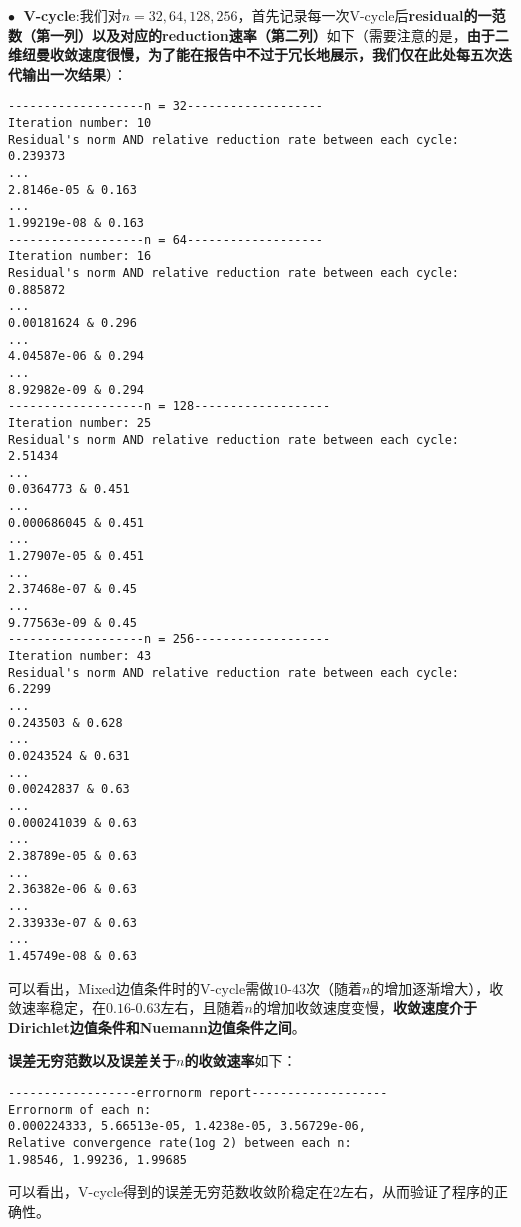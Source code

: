 \documentclass{ctexart}
\begin{document}
\begin{sloppypar}
$\bullet \;$ \textbf{V-cycle}:我们对$n=32,64,128,256$，首先记录每一次V-cycle后\textbf{residual的一范数（第一列）以及对应的reduction速率（第二列）}如下（需要注意的是，\textbf{由于二维纽曼收敛速度很慢，为了能在报告中不过于冗长地展示，我们仅在此处每五次迭代输出一次结果}）：
\begin{shaded}
\begin{verbatim}
-------------------n = 32-------------------
Iteration number: 10
Residual's norm AND relative reduction rate between each cycle: 
0.239373
...
2.8146e-05 & 0.163
...
1.99219e-08 & 0.163
-------------------n = 64-------------------
Iteration number: 16
Residual's norm AND relative reduction rate between each cycle: 
0.885872
...
0.00181624 & 0.296
...
4.04587e-06 & 0.294
...
8.92982e-09 & 0.294
-------------------n = 128-------------------
Iteration number: 25
Residual's norm AND relative reduction rate between each cycle: 
2.51434
...
0.0364773 & 0.451
...
0.000686045 & 0.451
...
1.27907e-05 & 0.451
...
2.37468e-07 & 0.45
...
9.77563e-09 & 0.45
-------------------n = 256-------------------
Iteration number: 43
Residual's norm AND relative reduction rate between each cycle: 
6.2299
...
0.243503 & 0.628
...
0.0243524 & 0.631
...
0.00242837 & 0.63
...
0.000241039 & 0.63
...
2.38789e-05 & 0.63
...
2.36382e-06 & 0.63
...
2.33933e-07 & 0.63
...
1.45749e-08 & 0.63
\end{verbatim}
\end{shaded}
可以看出，Mixed边值条件时的V-cycle需做$10$-$43$次（随着$n$的增加逐渐增大），收敛速率稳定，在$0.16$-$0.63$左右，且随着$n$的增加收敛速度变慢，\textbf{收敛速度介于Dirichlet边值条件和Nuemann边值条件之间}。

\textbf{误差无穷范数以及误差关于$n$的收敛速率}如下：
\begin{shaded}
\begin{verbatim}
------------------errornorm report-------------------
Errornorm of each n: 
0.000224333, 5.66513e-05, 1.4238e-05, 3.56729e-06, 
Relative convergence rate(1og 2) between each n: 
1.98546, 1.99236, 1.99685
\end{verbatim} 
\end{shaded}
可以看出，V-cycle得到的误差无穷范数收敛阶稳定在$2$左右，从而验证了程序的正确性。


\end{sloppypar}
\end{document}

